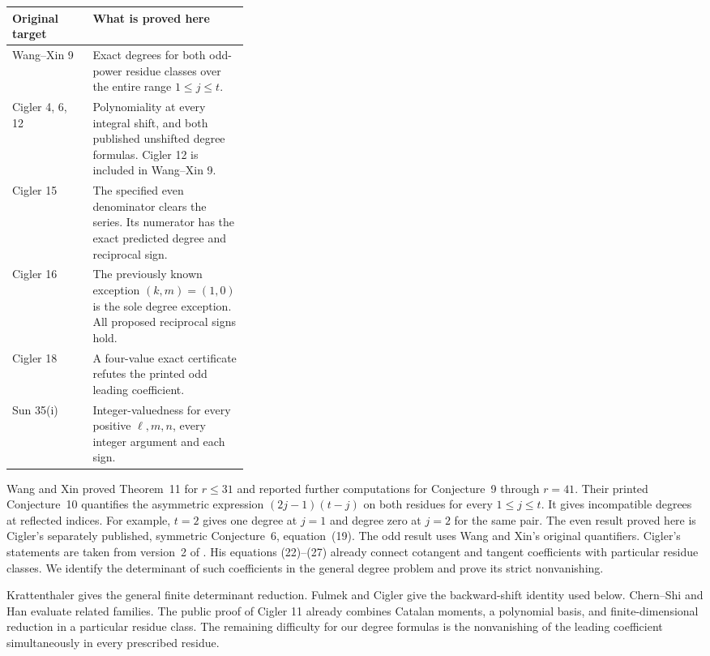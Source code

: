 \documentclass[11pt,a4paper]{article}
\theoremstyle{definition}\newtheorem{problem}[theorem]{Auxiliary problem}
\theoremstyle{remark}\newtheorem*{remark}{Remark}
\begin{document}
\begin{center}
\small\renewcommand{\arraystretch}{1.15}
\begin{tabularx}{\linewidth}{@{}p{0.34\linewidth}X@{}}
\toprule
Original target & What is proved here\\\midrule
Wang--Xin 9 \cite{WX} & Exact degrees for both odd-power residue classes over the entire range $1\le j\le t$.\\
Cigler 4, 6, 12 \cite{Cig} & Polynomiality at every integral shift, and both published unshifted degree formulas. Cigler 12 is included in Wang--Xin 9.\\
Cigler 15 \cite{Cig} & The specified even denominator clears the series. Its numerator has the exact predicted degree and reciprocal sign.\\
Cigler 16 \cite{Cig} & The previously known exception $(k,m)=(1,0)$ is the sole degree exception. All proposed reciprocal signs hold.\\
Cigler 18 \cite{Cig} & A four-value exact certificate refutes the printed odd leading coefficient.\\
Sun 35(i) \cite{Sun} & Integer-valuedness for every positive $\ell,m,n$, every integer argument and each sign.\\
\bottomrule
\end{tabularx}
\end{center}

Wang and Xin proved Theorem~11 for $r\le31$ and reported further computations for Conjecture~9 through $r=41$. Their printed Conjecture~10 quantifies the asymmetric expression $(2j-1)(t-j)$ on both residues for every $1\le j\le t$. It gives incompatible degrees at reflected indices. For example, $t=2$ gives one degree at $j=1$ and degree zero at $j=2$ for the same pair. The even result proved here is Cigler's separately published, symmetric Conjecture~6, equation~(19). The odd result uses Wang and Xin's original quantifiers. Cigler's statements are taken from version~2 of \cite{Cig}. His equations (22)--(27) already connect cotangent and tangent coefficients with particular residue classes. We identify the determinant of such coefficients in the general degree problem and prove its strict nonvanishing.

Krattenthaler \cite{Krat} gives the general finite determinant reduction. Fulmek and Cigler \cite{Back} give the backward-shift identity used below. Chern--Shi and Han \cite{Other} evaluate related families. The public proof of Cigler 11 \cite{Omega} already combines Catalan moments, a polynomial basis, and finite-dimensional reduction in a particular residue class. The remaining difficulty for our degree formulas is the nonvanishing of the leading coefficient simultaneously in every prescribed residue.
\end{document}
